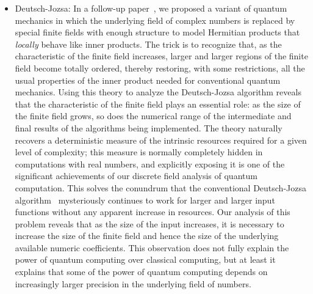 \documentclass{article}
\theoremstyle{remark}
\begin{document}
\begin{itemize}
\item Deutsch-Jozsa: In a follow-up paper~\cite{DQT2014}, we proposed
  a variant of quantum mechanics in which the underlying field of
  complex numbers is replaced by special finite fields with enough
  structure to model Hermitian products that \emph{locally} behave
  like inner products. The trick is to recognize that, as the
  characteristic of the finite field increases, larger and larger
  regions of the finite field become totally ordered, thereby
  restoring, with some restrictions, all the usual properties of the
  inner product needed for conventional quantum mechanics. Using this
  theory to analyze the Deutsch-Jozsa algorithm reveals that the
  characteristic of the finite field plays an essential role: as the
  size of the finite field grows, so does the numerical range of the
  intermediate and final results of the algorithms being implemented.
  The theory naturally recovers a deterministic measure of the
  intrinsic resources required for a given level of complexity; this
  measure is normally completely hidden in computations with real
  numbers, and explicitly exposing it is one of the significant
  achievements of our discrete field analysis of quantum computation.
  This solves the conundrum that the conventional Deutsch-Jozsa
  algorithm~\cite{DeutschJozsa1992,Jaeger2007}
  mysteriously continues to work for larger and larger input
  functions without any apparent increase in resources.  Our analysis
  of this problem reveals that as the size of the input increases, it
  is necessary to increase the size of the finite field and hence the
  size of the underlying available numeric coefficients.  This
  observation does not fully explain the power of quantum computing
  over classical computing, but at least it explains that some of the
  power of quantum computing depends on increasingly larger precision
  in the underlying field of numbers.

\end{itemize}
\end{document}
